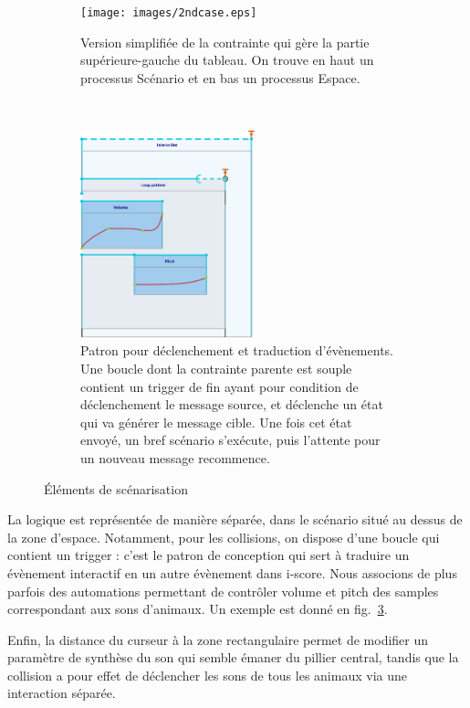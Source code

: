 \documentclass[french]{article}
\begin{document}
    \begin{figure}[h]
        \centering
        
        \begin{subfigure}[t]{0.45\textwidth}\vskip 0pt
            \centering
        \texttt{[image: images/2ndcase.eps]}
        \caption{Version simplifiée de la contrainte qui gère la partie supérieure-gauche du tableau. On trouve en haut un processus Scénario et en bas un processus Espace.}
        \label{fig.2ndcase}
        \end{subfigure}~
        \begin{subfigure}[t]{0.45\textwidth}\vskip 0pt
        \centering
        \includegraphics[height=6cm]{images/trigger.eps}
        \caption{Patron pour déclenchement et traduction d'évènements. Une boucle dont la contrainte parente est souple contient un trigger de fin ayant pour condition de déclenchement le message source, et déclenche un état qui va générer le message cible. Une fois cet état envoyé, un bref scénario s'exécute, puis l'attente pour un nouveau message recommence.}
        \label{fig.trigger}
        \end{subfigure}
        \caption{Éléments de scénarisation}
       
    \end{figure}
    
    La logique est représentée de manière séparée, dans le scénario situé au dessus de la zone d'espace.
    Notamment, pour les collisions, on dispose d'une boucle qui contient un trigger : c'est le patron de conception qui sert à traduire un évènement interactif en un autre évènement dans i-score. Nous associons de plus parfois des automations permettant de contrôler volume et pitch des samples correspondant aux sons d'animaux. 
    Un exemple est donné en fig.~\ref{fig.trigger}.
    
    Enfin, la distance du curseur à la zone rectangulaire permet de modifier un paramètre de synthèse du son qui semble émaner du pillier central, tandis que la collision a pour effet de déclencher les sons de tous les animaux via une interaction séparée.
    
\end{document}
